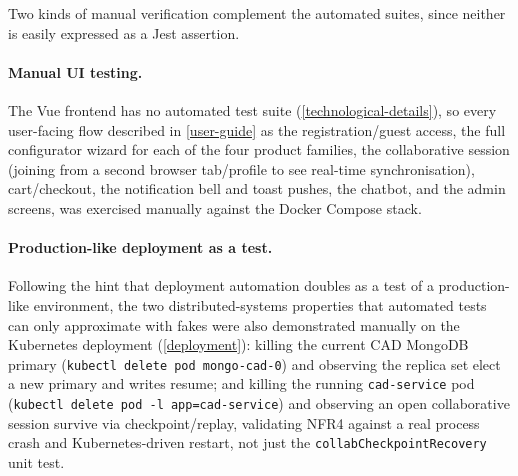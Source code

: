 Two kinds of manual verification complement the automated suites, since
neither is easily expressed as a Jest assertion.

\paragraph{Manual UI testing.} The Vue frontend has no automated test suite
(\cref{technological-details}), so every user-facing flow described in
\cref{user-guide} as the registration/guest access, the full configurator
wizard for each of the four product families, the collaborative session
(joining from a second browser tab/profile to see real-time synchronisation),
cart/checkout, the notification bell and toast pushes, the chatbot, and the admin screens,
was exercised manually against the Docker Compose stack.

\paragraph{Production-like deployment as a test.} Following the hint that
deployment automation doubles as a test of a production-like environment,
the two distributed-systems properties that automated tests can only
approximate with fakes were also demonstrated manually on the Kubernetes
deployment (\cref{deployment}): killing the current CAD MongoDB primary
(\texttt{kubectl delete pod mongo-cad-0}) and observing the replica set
elect a new primary and writes resume; and killing the running
\texttt{cad-service} pod (\texttt{kubectl delete pod -l app=cad-service}) and
observing an open collaborative session survive via checkpoint/replay,
validating NFR4 against a real process crash and
Kubernetes-driven restart, not just the
\texttt{collabCheckpointRecovery} unit test.
